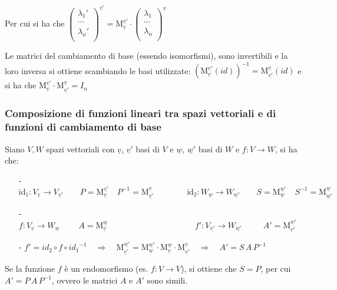 \documentclass[a4paper]{article}
\newcommand\m[2]{\text{M}_{\underline{#1}}^{\underline{#2}}}
\begin{document}
Per cui si ha che \(\begin{pmatrix} \lambda_1' \\ \cdots \\ \lambda_n' \\ \end{pmatrix}^{\underline{v'}} = \m{v}{v'} \cdot \begin{pmatrix} \lambda_1 \\ \cdots \\ \lambda_n \\ \end{pmatrix}^{\underline{v}}\)

Le matrici del cambiamento di base (essendo isomorfismi), sono invertibili e la loro inversa si ottiene scambiando le basi utilizzate:
\(\left( \m{v}{v'}(id) \right)^{-1} = \m{v'}{v}(id)\) e si ha che \(\m{v}{v'} \cdot \m{v'}{v} = I_n\)

\hypertarget{composizioneFunzioniCambiamentiDiBase}{\subsubsection*{Composizione di funzioni lineari tra spazi vettoriali e di funzioni di cambiamento di base}}
Siano \(V, W\) spazi vettoriali con \(\underline{v}\), \(\underline{v'}\) basi di \(V\) e \(\underline{w}\), \(\underline{w'}\)
basi di \(W\) e \(f: V \to W\), si ha che:
\begin{itemize}
	\item[-] \(\text{id}_1: V_{\underline{v}} \to V_{\underline{v'}} \qquad P = \m{v}{v'} \quad P^{-1} = \m{v'}{v} \qquad \qquad \text{id}_2: W_{\underline{w}} \to W_{\underline{w'}} \qquad S = \m{w}{w'} \quad S^{-1} = \m{w'}{w}\)
	\item[-] \(f: V_{\underline{v}} \to W_{\underline{w}} \qquad \; A = \m{v}{w} \qquad \qquad \qquad \qquad \qquad \;\; f': V_{\underline{v'}} \to W_{\underline{w'}} \qquad \;\; A' = \m{v'}{w'}\)
	\item[-] \(f' = id_2 \circ f \circ {id_1}^{-1} \quad \Rightarrow \quad \m{v'}{w'} = \m{w}{w'} \cdot \m{v}{w} \cdot \m{v'}{v} \quad \Rightarrow \quad A' = S \, A \, P^{-1}\)
\end{itemize}
Se la funzione \(f\) è un endomorfismo (es. \(f: V \to V\)), si ottiene che \(S = P\), per cui \(A' = P \, A \, P^{-1}\), ovvero
le matrici \(A\) e \(A'\) sono simili.
\end{document}
